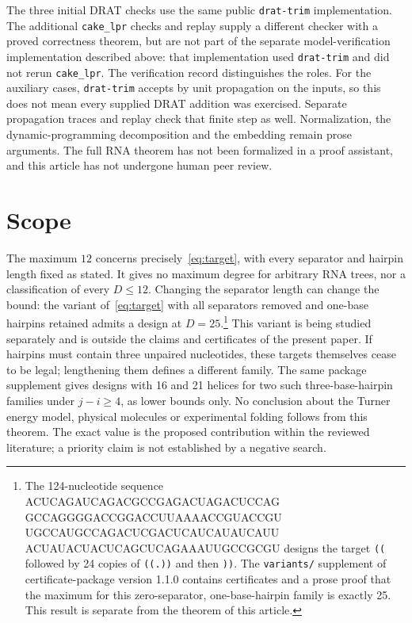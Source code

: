 \documentclass[11pt,a4paper]{article}
\theoremstyle{definition}
\begin{document}
The three initial DRAT checks use the same public \texttt{drat-trim}
implementation. The additional \texttt{cake\_lpr} checks and replay
supply a different checker with a proved correctness theorem, but are
not part of the separate model-verification implementation described
above: that implementation used \texttt{drat-trim} and did not rerun
\texttt{cake\_lpr}. The verification record distinguishes the roles.
For the auxiliary cases, \texttt{drat-trim} accepts by unit propagation
on the inputs, so this does not mean every supplied DRAT addition was
exercised. Separate propagation traces and replay check that finite
step as well. Normalization, the dynamic-programming decomposition and
the embedding remain prose arguments. The full RNA theorem has not
been formalized in a proof assistant, and this article has not undergone
human peer review.

\section{Scope}
The maximum $12$ concerns precisely~\eqref{eq:target}, with every
separator and hairpin length fixed as stated. It gives no maximum
degree for arbitrary RNA trees, nor a classification of every
$D\leq12$. Changing the separator length can change the bound: the
variant of~\eqref{eq:target} with all separators removed and one-base
hairpins retained admits a design at $D=25$.\footnote{\raggedright The 124-nucleotide sequence
{\ttfamily\footnotesize
ACUCAGAUCAGACGCCGAGACUAGACUCCAG\allowbreak{}
GCCAGGGGACCGGACCUUAAAACCGUACCGU\allowbreak{}
UGCCAUGCCAGACUCGACUCAUCAUAUCAUU\allowbreak{}
ACUAUACUACUCAGCUCAGAAAUUGCCGCGU}
designs the target \texttt{((} followed by 24 copies of \texttt{((.))} and then \texttt{))}. The \texttt{variants/} supplement of certificate-package version 1.1.0 contains certificates and a prose proof that the maximum for this zero-separator, one-base-hairpin family is exactly 25. This result is separate from the theorem of this article.} This variant is being
studied separately and is outside the claims and certificates of the
present paper. If hairpins must contain three unpaired nucleotides, these
targets themselves cease to be legal; lengthening them defines a
different family. The same package supplement gives designs with 16 and 21 helices for two such three-base-hairpin families under $j-i\geq4$, as lower bounds only. No conclusion about the Turner energy model,
physical molecules or experimental folding follows from this theorem.
The exact value is the proposed contribution within the reviewed
literature; a priority claim is not established by a negative search.
\end{document}
